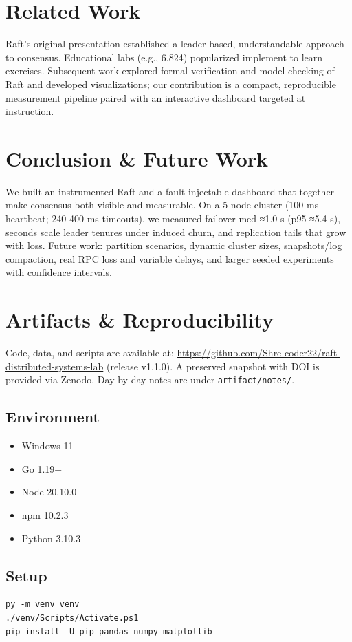 \documentclass[11pt]{article}
\begin{document}
\section{Related Work}
Raft's original presentation established a leader based, understandable approach to consensus. Educational labs (e.g., 6.824) popularized implement to learn exercises. Subsequent work explored formal verification and model checking of Raft and developed visualizations; our contribution is a compact, reproducible measurement pipeline paired with an interactive dashboard targeted at instruction.

\section{Conclusion \& Future Work}
We built an instrumented Raft and a fault injectable dashboard that together make consensus both visible and measurable. On a 5 node cluster (100 ms heartbeat; 240-400 ms timeouts), we measured failover med ≈1.0 s (p95 ≈5.4 s), seconds scale leader tenures under induced churn, and replication tails that grow with loss. Future work: partition scenarios, dynamic cluster sizes, snapshots/log compaction, real RPC loss and variable delays, and larger seeded experiments with confidence intervals.

\section*{Artifacts \& Reproducibility}

Code, data, and scripts are available at:  
\url{https://github.com/Shre-coder22/raft-distributed-systems-lab} (release v1.1.0).  
A preserved snapshot with DOI is provided via Zenodo.  
Day-by-day notes are under \texttt{artifact/notes/}.

\subsection*{Environment}
\begin{itemize}
  \item Windows 11
  \item Go 1.19+
  \item Node 20.10.0
  \item npm 10.2.3
  \item Python 3.10.3
\end{itemize}

\subsection*{Setup}
\begin{verbatim}
py -m venv venv
./venv/Scripts/Activate.ps1
pip install -U pip pandas numpy matplotlib
\end{verbatim}
\end{document}
